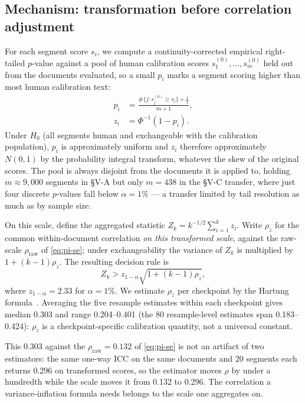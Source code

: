 \documentclass[10pt,conference,a4paper]{IEEEtran}
\newcommand{\sect}[1]{\S#1}
\begin{document}
\subsection{Mechanism: transformation before correlation adjustment}
For each segment score $s_i$, we compute a continuity-corrected empirical right-tailed
$p$-value against a pool of human calibration scores $s^{(0)}_1,\ldots,s^{(0)}_m$
held out from the documents evaluated, so a small $p_i$ marks a segment scoring higher
than most human calibration text:
\begin{equation}
\begin{aligned}
p_i&=\frac{\#\{j:s^{(0)}_j\ge s_i\}+\tfrac{1}{2}}{m+1},\\
z_i&=\Phi^{-1}(1-p_i).
\end{aligned}
\label{eq:pit-transform}
\end{equation}
Under $H_0$ (all segments human and exchangeable with the calibration population),
$p_i$ is approximately uniform and $z_i$ therefore approximately $N(0,1)$ by the
probability integral transform, whatever the skew of the original scores. The pool is
always disjoint from the documents it is applied to, holding $m\approx9{,}000$ segments
in \sect{V-A} but only $m{=}438$ in the \sect{V-C} transfer, where just four discrete
$p$-values fall below $\alpha{=}1\%$ --- a transfer limited by tail resolution as much
as by sample size.

On this scale, define the aggregated statistic $Z_k=k^{-1/2}\sum_{i=1}^{k}z_i$.
Write $\rho_z$ for the common within-document correlation \emph{on this transformed
scale}, against the raw-scale $\rho_{\text{raw}}$ of \eqref{eq:pi-se}; under
exchangeability the variance of $Z_k$ is multiplied by $1+(k-1)\rho_z$. The resulting decision rule is
\begin{equation}
Z_k>z_{1-\alpha}\sqrt{1+(k-1)\rho_z},
\label{eq:hartung-threshold}
\end{equation}
where $z_{1-\alpha}=2.33$ for $\alpha=1\%$. We estimate $\rho_z$ per checkpoint by the
Hartung formula~\cite{hartung1999}. Averaging the five resample estimates within each
checkpoint gives median 0.303 and range 0.204--0.401 (the 80 resample-level estimates span
0.183--0.424): $\rho_z$ is a checkpoint-specific calibration quantity, not a
universal constant.

This 0.303 against the $\rho_{\text{raw}}=0.132$ of \eqref{eq:pi-se} is not an artifact
of two estimators: the same one-way ICC on the same documents and $20$ segments each
returns 0.296 on transformed scores, so the estimator moves $\rho$ by under a hundredth
while the scale moves it from 0.132 to 0.296. The correlation a variance-inflation
formula needs belongs to the scale one aggregates on.
\end{document}
